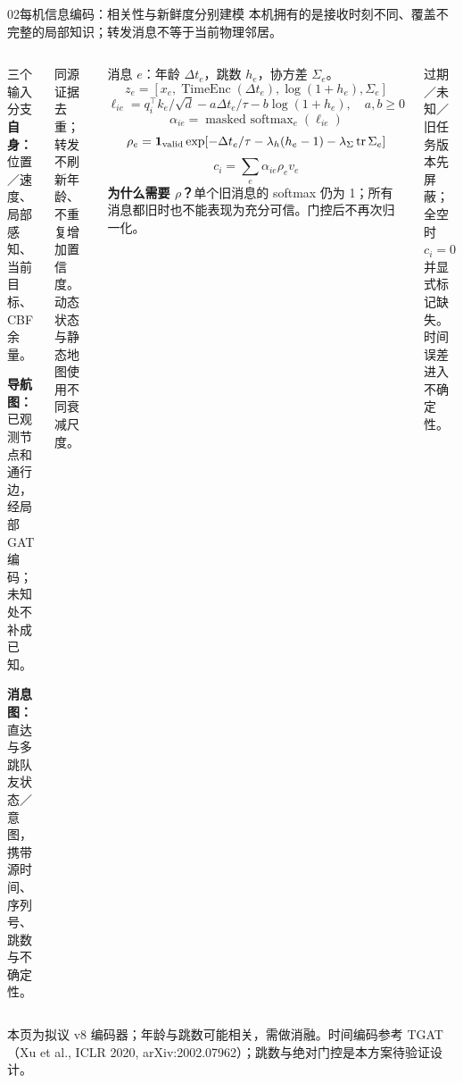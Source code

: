 \documentclass[aspectratio=169,10pt]{beamer}
\let\reportSmall\small
\renewcommand{\small}{\reportSmall
  \setlength{\abovedisplayskip}{4pt}\setlength{\belowdisplayskip}{4pt}
  \setlength{\abovedisplayshortskip}{3pt}\setlength{\belowdisplayshortskip}{3pt}}
\newcommand{\tagline}[1]{{\small\color{teal}#1}\par\vspace{2mm}}
\newcommand{\notefoot}[1]{{\fontsize{6.8}{8}\selectfont\color{navy!75}#1\par}}
\begin{document}
\begin{frame}[t]{02\quad 每机信息编码：相关性与新鲜度分别建模}
\tagline{本机拥有的是接收时刻不同、覆盖不完整的局部知识；转发消息不等于当前物理邻居。}
\begin{columns}[T,onlytextwidth]
\begin{block}{三个输入分支}
\small
\textbf{自身：}位置／速度、局部感知、当前目标、CBF 余量。\par
\textbf{导航图：}已观测节点和通行边，经局部 GAT 编码；未知处不补成已知。\par
\textbf{消息图：}直达与多跳队友状态／意图，携带源时间、序列号、跳数与不确定性。
\end{block}
\par\medskip
\small
同源证据去重；转发不刷新年龄、不重复增加置信度。动态状态与静态地图使用不同衰减尺度。

\small
消息 $e$：年龄 $\Delta t_e$，跳数 $h_e$，协方差 $\Sigma_e$。
\[
 z_e=[x_e,\operatorname{TimeEnc}(\Delta t_e),\log(1+h_e),\Sigma_e]
\]
\[
 \ell_{ie}=q_i^\top k_e/\sqrt d
 -a\Delta t_e/\tau-b\log(1+h_e),\quad a,b\geq0
\]
\[
 \alpha_{ie}=\operatorname{masked\ softmax}_e(\ell_{ie})
\]
\[
 \rho_e=\mathbf1_{\rm valid}\exp\!\left[-\Delta t_e/\tau
 -\lambda_h(h_e-1)-\lambda_\Sigma\operatorname{tr}\Sigma_e\right]
\]
\[
 \boxed{c_i=\sum_e\alpha_{ie}\rho_e v_e}
\]
\textbf{为什么需要 $\rho$？}单个旧消息的 softmax 仍为 1；所有消息都旧时也不能表现为充分可信。门控后不再次归一化。\par
过期／未知／旧任务版本先屏蔽；全空时 $c_i=0$ 并显式标记缺失。时间误差进入不确定性。
\end{columns}
\vspace{1mm}
\notefoot{本页为拟议 v8 编码器；年龄与跳数可能相关，需做消融。时间编码参考 TGAT（Xu et al., ICLR 2020, arXiv:2002.07962）；跳数与绝对门控是本方案待验证设计。}
\end{frame}
\end{document}
